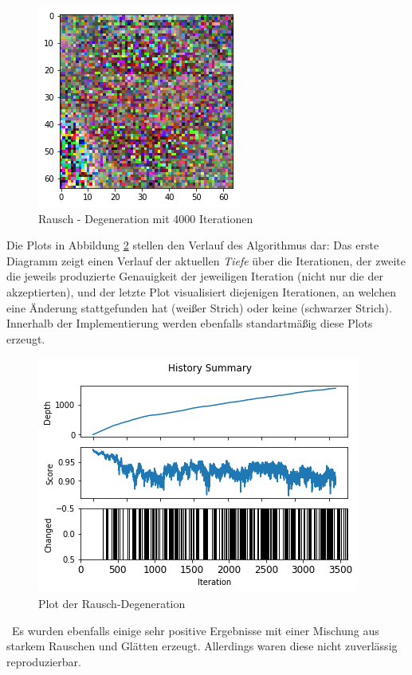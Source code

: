 \begin{figure}[h]
	\centering
	\includegraphics[width=0.4\linewidth]{Images/DegenSamples/StopTiefe4000}
	\caption[Degeneration Tiefe 4000]{Rausch - Degeneration mit 4000 Iterationen}
	\label{fig:stoptiefe4000}
\end{figure}

Die Plots in Abbildung \ref{fig:plotTiefe4000} stellen den Verlauf des Algorithmus dar: Das erste Diagramm zeigt einen Verlauf der aktuellen \textit{Tiefe} über die Iterationen, der zweite die jeweils produzierte Genauigkeit der jeweiligen Iteration (nicht nur die der akzeptierten), und der letzte Plot visualisiert diejenigen Iterationen, an welchen eine Änderung stattgefunden hat (weißer Strich) oder keine (schwarzer Strich). Innerhalb der Implementierung werden ebenfalls standartmäßig diese Plots erzeugt.

\begin{figure}[h]
	\centering
	\includegraphics[width=0.6\linewidth]{Images/DegenSamples/StopTiefe4000Plot}
	\caption[Plot Degeneration]{Plot der Rausch-Degeneration}
	\label{fig:plotTiefe4000}
\end{figure}
~\newline Es wurden ebenfalls einige sehr positive Ergebnisse mit einer Mischung aus starkem Rauschen und Glätten erzeugt. Allerdings waren diese nicht zuverlässig reproduzierbar. 

